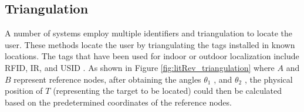 \begin{comment}
  \begin{table}[ht!]
              \centering
              \caption{RF Technology Comparison}
              \label{tab:litRev_RFcompare}
              \begin{tabular}{l l l p{5cm}}
              \textbf{RTLS technology standard} & \textbf{Frequency/wavelength} & \textbf{Accuracy} & \textbf{Potential interference} \\ \hline \noalign{\smallskip}
              Ultrasound & 35–45 KHz &  & Ultrasonic animal control devices (such as for dogs or birds) \\
              Wi-Fi & 2.4 GHz &  & Wireless LAN (IEEE 802.11b/g), microwave ovens, cordless phones, 2.4 GHz wireless transmitters (audio/video systems, baby monitors) \\ \noalign{\smallskip}
              ZigBee (IEEE 802.15.4) & 2.4 GHz &  & Wireless LAN (IEEE 802.11b/g), microwave ovens,cordless phones, 2.4 GHz wireless transmitters (audio/video systems, baby monitors), temperature sensors \\ \noalign{\smallskip}
              Ultrawide band (UWB) & 2.4 GHz, 6.35–6.67 GHz &  & Aeronautical mobile devices (radar) \\ \noalign{\smallskip}
              Infrared & Approximately 875 nm &  & Remote meter readers, home entertainment remote control systems, automatic door openers (car remotes, garage doors), directed bright light
              \end{tabular}
             \end{table}

\end{comment}         
            
            \subsection{Triangulation}
            A number of systems employ multiple identifiers and triangulation to locate the user. These methods locate the user by triangulating the tags installed in known locations. The tags that have been used for indoor or outdoor localization include RFID, IR, and USID \cite{fallah2013indoor}. As shown in Figure \ref{fig:litRev_triangulation} where $A$ and $B$ represent reference nodes, after obtaining the angles $\theta_1$ , and $\theta_2$ , the physical position of $T$ (representing the target to be located) could then be calculated based on the predetermined coordinates of the reference nodes.
            
